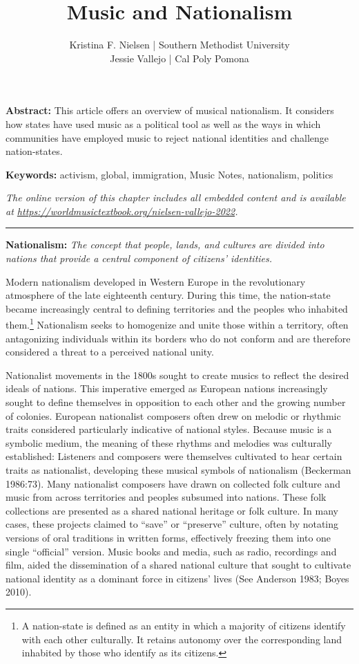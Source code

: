 \documentclass[twoside]{article}
\title{Music and Nationalism}
\author{Kristina F. Nielsen | Southern Methodist University\\Jessie Vallejo | Cal Poly Pomona}
\date{}
\makeatletter
\renewcommand{\maketitle}{\bgroup\setlength{\parindent}{0pt}
\begin{flushleft}
  \vspace*{3\baselineskip}
  \huge{\textbf{\@title}}

  \medskip
  
  \large{\@author}
\end{flushleft}\egroup
}
\providecommand{\abstracttext}[1]
{
  \noindent
  \textbf{Abstract:} #1
}
\providecommand{\keywords}[1]
{
  \newline
  \textbf{Keywords:} #1
}
\providecommand{\wmturl}{\href{https://worldmusictextbook.org/nielsen-vallejo-2022}{https://worldmusictextbook.org/nielsen-vallejo-2022}}
\providecommand{\wmturltext}{
  \noindent\emph{The online version of this chapter includes all embedded content and is available at \wmturl.}
}
\makeatother
\begin{document}
\suppressfloats %
\maketitle

\abstracttext{This article offers an overview of musical nationalism. It considers how states have used music as a political tool as well as the ways in which communities have employed music to reject national identities and challenge nation-states.}
\keywords{activism, global, immigration, Music Notes, nationalism, politics}

\smallskip

\wmturltext

\medskip

\noindent\hfil\rule{0.5\textwidth}{0.4pt}\hfil

\bigskip

\noindent\textbf{Nationalism:} \emph{The concept that people, lands, and cultures
are divided into nations that provide a central component of citizens'
identities.}

\bigskip

Modern nationalism developed in Western Europe in the revolutionary
atmosphere of the late eighteenth century. During this time, the
nation-state became increasingly central to defining territories and the
peoples who inhabited them.\footnote{A nation-state is defined as an
  entity in which a majority of citizens identify with each other
  culturally. It retains autonomy over the corresponding land inhabited
  by those who identify as its citizens.} Nationalism seeks to
homogenize and unite those within a territory, often antagonizing
individuals within its borders who do not conform and are therefore
considered a threat to a perceived national unity.

\sloppy
Nationalist movements in the 1800s sought to create musics to reflect
the desired ideals of nations. This imperative emerged as European
nations increasingly sought to define themselves in opposition to each
other and the growing number of colonies. European nationalist composers
often drew on melodic or rhythmic traits considered particularly
indicative of national styles. Because music is a symbolic medium, the
meaning of these rhythms and melodies was culturally established:
Listeners and composers were themselves cultivated to hear certain
traits as nationalist, developing these musical symbols of nationalism
(Beckerman 1986:73). Many nationalist composers have drawn on collected
folk culture and music from across territories and peoples subsumed into
nations. These folk collections are presented as a shared national
heritage or folk culture. In many cases, these projects claimed to
``save'' or ``preserve'' culture, often by notating versions of oral
traditions in written forms, effectively freezing them into one single
``official'' version. Music books and media, such as radio, recordings
and film, aided the dissemination of a shared national culture that
sought to cultivate national identity as a dominant force in citizens'
lives (See Anderson 1983; Boyes 2010).
\end{document}
